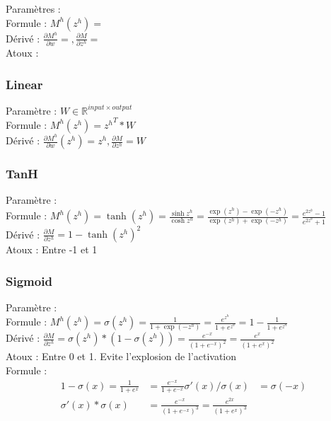 \documentclass{article}
\theoremstyle{plain}%
\theoremstyle{definition}
\theoremstyle{remark}
\begin{document}
\begin{multicols}{2}
Paramètres : \\
Formule : $ M^h(z^h) =  $ \\
Dérivé : $ \frac{\partial M^h}{\partial w} = , \frac{\partial M}{\partial z^h} = $ \\
Atoux : 


\subsubsection{Linear}
Paramètre : $ W \in \mathbb{R}^{input \times output} $ \\
Formule : $ M^h(z^h) =  {z^h}^T * W $ \\
Dérivé : $ \frac{\partial M^h}{\partial w}(z^h) = z^h, \frac{\partial M}{\partial z^h} = W $ \\

\subsubsection{TanH}
Paramètre : \\
Formule : $ M^h(z^h) =  \tanh(z^h) = \frac{\sinh z^h}{\cosh z^h} = \frac{\exp(z^h) - \exp(-z^h)} {\exp(z^h) + \exp(-z^h)} = \frac{e^{2z^h} - 1 }{e^{2z^h} + 1}$ \\
Dérivé : $\frac{\partial M}{\partial z^h} = 1 - \tanh (z^h)^2$ \\
Atoux : Entre -1 et 1


\subsubsection{Sigmoid}
Paramètre : \\
Formule : $ \displaystyle M^h(z^h) =  \sigma(z^h) = \frac{1}{1 + \exp(-z^h)} = \frac{e^{z^h}}{1 + e^{z^h}} = 1 - \frac{1}{1 + e^{z^h}}$ \\
Dérivé : $ \displaystyle \frac{\partial M}{\partial z^h} = \sigma (z^h) * (1 - \sigma (z^h)) = \frac{e^{-x}}{(1 + e^{-x})^2} = \frac{e^{x}}{(1+e^x)^2}$ \\
Atoux : Entre 0 et 1. Evite l'explosion de l'activation \\ 
Formule : \begin{align*}
    1 - \sigma (x) = \frac{1}{1 + e^x} &= \frac{e^{-x}}{1+e^{-x}}
    \sigma '(x) / \sigma (x) &= \sigma (-x) \\
    \sigma '(x) * \sigma (x) &= \frac{e^{-x}}{(1 + e^{-x})^3} = \frac{e^{2x}}{(1 + e^{x})^3}
\end{align*}



\end{multicols}
\end{document}
